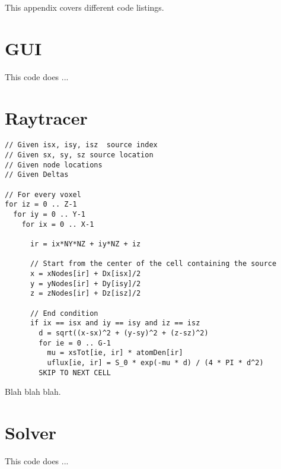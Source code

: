 


This appendix covers different code listings.

\section{GUI}

This code does ...

\section{Raytracer}

\begin{listing}
\begin{verbatim}
// Given isx, isy, isz  source index
// Given sx, sy, sz source location
// Given node locations
// Given Deltas

// For every voxel
for iz = 0 .. Z-1
  for iy = 0 .. Y-1
    for ix = 0 .. X-1
    
      ir = ix*NY*NZ + iy*NZ + iz
    
      // Start from the center of the cell containing the source
      x = xNodes[ir] + Dx[isx]/2
      y = yNodes[ir] + Dy[isy]/2
      z = zNodes[ir] + Dz[isz]/2
      
      // End condition
      if ix == isx and iy == isy and iz == isz
        d = sqrt((x-sx)^2 + (y-sy)^2 + (z-sz)^2)
        for ie = 0 .. G-1
          mu = xsTot[ie, ir] * atomDen[ir]
          uflux[ie, ir] = S_0 * exp(-mu * d) / (4 * PI * d^2)
        SKIP TO NEXT CELL

\end{verbatim}
\caption{Blah blah blah.}\label{lst:sync1}
\end{listing}

\section{Solver}

This code does ...

\endinput

